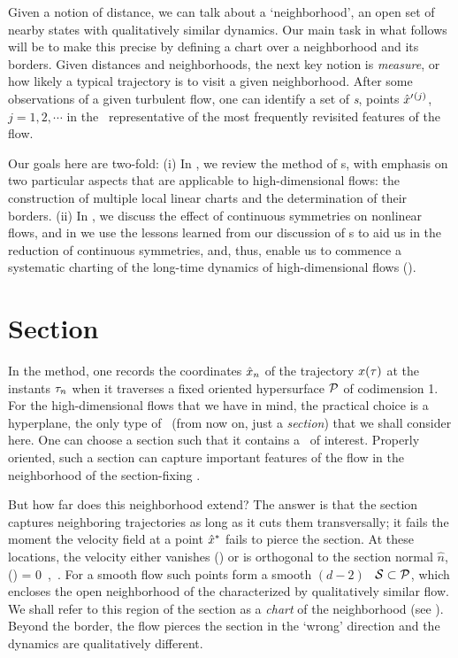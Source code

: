 \documentclass[aip,cha,reprint,
secnumarabic,
nofootinbib, tightenlines,
nobibnotes, showkeys, showpacs,
groupedaddress
]{revtex4-1}
\begin{document}
Given a notion of distance, we can talk about a `neighborhood', an open
set of nearby states with qualitatively similar dynamics. Our main task
in what follows will be to make this precise by defining a chart over a
neighborhood and its borders. Given distances and neighborhoods, the next
key notion is  \emph{measure}, or how likely a typical trajectory is to
visit a given neighborhood. After some observations of a given turbulent
flow, one can identify a set of \emph{\template
s}, {points} ${\hat{x}'}{}^{(j)}$,
$j=1,2,\cdots$ in the \statesp\ representative of the most frequently
revisited features of the flow.

Our goals here are two-fold:
(i) In , we review the method of \PoincSec s, with
    emphasis on two particular aspects that are applicable to
    high-dimensional flows: the construction of multiple local linear
    charts and the determination of their borders.
(ii) In , we discuss the effect of continuous symmetries on
    nonlinear flows, and in  we use the lessons learned
    from our discussion of \PoincSec s to aid us in the reduction of
    continuous symmetries, and, thus, enable us to commence a systematic
    charting of the long-time dynamics of high-dimensional flows
    ().


\section{Section}
\label{s:cut}

In the {\em \PoincSec} method, one records the coordinates $\hat{x}_n$ of
the trajectory $x(\tau)$ at the instants $\tau_n$ when it traverses
a fixed oriented hypersurface ${\cal P}$ of codimension 1. For the
high-dimensional flows that we have in mind, the practical choice is a
hyperplane, the only type of \PoincSec\ (from now on, just a
\emph{section}) that we shall consider here. One can choose a section
such that it contains a \template\ of interest. Properly oriented, such a
section can capture important features of the flow in the neighborhood of
the section-fixing \template.

But how far does this neighborhood extend? The answer is that the section
captures neighboring trajectories as long as it cuts them transversally;
it fails the moment the velocity field at a point $\hat{x}^\ast$ fails to
pierce the section. At these locations, the velocity either vanishes
(\eqv) or is orthogonal to the section normal $\hat{n}$,
\beq
     \cdot \vel(\sspRSing) = 0
\,,\qquad
    \sspRSing \in {}
\,.
For a smooth flow such points form a smooth $(d\!-\!2)$\dmn\
\emph{\poincBord} ${\cal S} \subset {\cal P}$, which encloses the open
neighborhood of the {\template} characterized by qualitatively similar
flow. We shall refer to this region of the section as a \emph{chart} of the
{\template} neighborhood (see \reffig{fig:RoessTrjs}). Beyond the border,
the flow pierces the section in the `wrong' direction and the dynamics
are qualitatively different.
\end{document}
